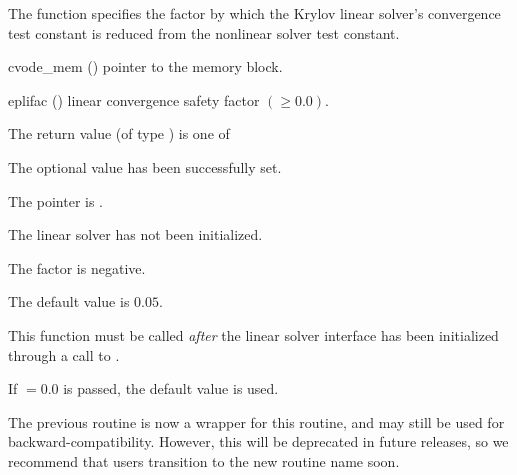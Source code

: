 {
  The function  specifies the factor by
  which the Krylov linear solver's convergence test constant is
  reduced from the nonlinear solver test constant.
}
{
  \begin{args}
  \item[cvode\_mem] ()
    pointer to the {\cvodes} memory block.
  \item[eplifac] () linear convergence safety factor $(
    \geq 0.0)$.

  \end{args}
}
{
  The return value  (of type ) is one of
  \begin{args}
  \item[\Id{CVLS\_SUCCESS}]
    The optional value has been successfully set.
  \item[\Id{CVLS\_MEM\_NULL}]
    The  pointer is .
  \item[\Id{CVLS\_LMEM\_NULL}]
    The {\cvls} linear solver has not been initialized.
  \item[\Id{CVLS\_ILL\_INPUT}]
    The factor  is negative.
  \end{args}
}
{
  The default value is $0.05$.

  This function must be called \emph{after} the {\cvls} linear solver
  interface has been initialized through a call to
  .

  If $ = 0.0$ is passed, the default value is used.

  The previous routine  is now a wrapper for this
  routine, and may still be used for backward-compatibility.  However,
  this will be deprecated in future releases, so we recommend that
  users transition to the new routine name soon.
}



